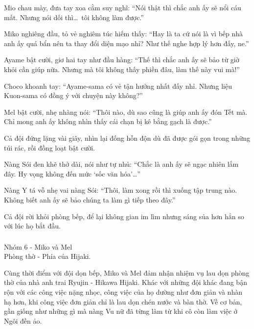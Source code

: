 \documentclass[../main.tex]{subfiles}
\begin{document}
Mio chau mày, đưa tay xoa cằm suy nghĩ: ``Nói thật thì chắc anh ấy sẽ nổi cáu mất. Nhưng nói dối thì\dots\ tôi không làm được.''

Miko nghiêng đầu, tỏ vẻ nghiêm túc hiếm thấy: ``Hay là ta cứ nói là vì bếp nhà anh ấy quá bẩn nên ta thay đổi diện mạo nhỉ? Như thế nghe hợp lý hơn đấy, ne.''

Ayame bật cười, giơ hai tay như đầu hàng: ``Thế thì chắc anh ấy sẽ bảo từ giờ khỏi cần giúp nữa. Nhưng mà tôi không thấy phiền đâu, làm thế này vui mà!''

Choco khoanh tay: ``Ayame-sama có vẻ tận hưởng nhất đấy nhỉ. Nhưng liệu Kuon-sama có đồng ý với chuyện này không?''

Mel bật cười, nhẹ nhàng nói: ``Thôi nào, dù sao cũng là giúp anh ấy đón Tết mà. Chỉ mong anh ấy không nhìn thấy cái chạn bị kê bằng gạch là được.'' %

Cả đội đứng lặng vài giây, nhìn lại đống hỗn độn dù đã được gói gọn trong những túi rác, rồi đồng loạt bật cười.

Nàng Sói đen khẽ thở dài, nói như tự nhủ: ``Chắc là anh ấy sẽ ngạc nhiên lắm đây. Hy vọng không đến mức `sốc văn hóa'\dots''

Nàng Y tá vỗ nhẹ vai nàng Sói: ``Thôi, làm xong rồi thì xuống tập trung nào. Không biết anh ấy sẽ bảo chúng ta làm gì tiếp theo đây.''

Cả đội rời khỏi phòng bếp, để lại không gian im lìm nhưng sáng sủa hơn hẳn so với lúc họ bắt đầu.

\vspace{-40pt} \subsubsection*{\label{ep-003.IVf}} 

\begin{center}
    {\color{T6} Nhóm 6 - Miko và Mel}\\Phòng thờ - Phía của Hijaki.
\end{center}

Cùng thời điểm với đội dọn bếp, Miko và Mel đảm nhận nhiệm vụ lau dọn phòng thờ của nhà anh trai Ryujin - Hikawa Hijaki. Khác với những đội khác đang bận rộn với các công việc nặng nhọc, công việc của họ dường như đơn giản và nhàn hạ hơn, khi công việc đơn giản chỉ là lau dọn chén nước và bàn thờ. Về cơ bản, gần giống như những gì mà nàng Vu nữ đã từng làm từ khi cô còn làm việc ở Ngôi đền ảo.
\end{document}
